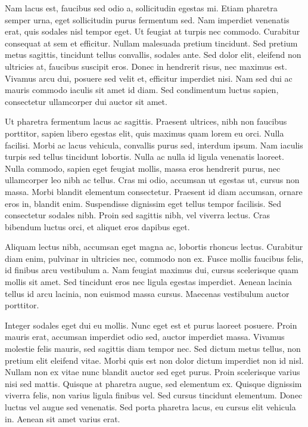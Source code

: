 \documentclass[12pt]{article}
\begin{document}
Nam lacus est, faucibus sed odio a, sollicitudin egestas mi. Etiam pharetra semper urna, eget sollicitudin purus fermentum sed. Nam imperdiet venenatis erat, quis sodales nisl tempor eget. Ut feugiat at turpis nec commodo. Curabitur consequat at sem et efficitur. Nullam malesuada pretium tincidunt. Sed pretium metus sagittis, tincidunt tellus convallis, sodales ante. Sed dolor elit, eleifend non ultricies at, faucibus suscipit eros. Donec in hendrerit risus, nec maximus est. Vivamus arcu dui, posuere sed velit et, efficitur imperdiet nisi. Nam sed dui ac mauris commodo iaculis sit amet id diam. Sed condimentum luctus sapien, consectetur ullamcorper dui auctor sit amet.

Ut pharetra fermentum lacus ac sagittis. Praesent ultrices, nibh non faucibus porttitor, sapien libero egestas elit, quis maximus quam lorem eu orci. Nulla facilisi. Morbi ac lacus vehicula, convallis purus sed, interdum ipsum. Nam iaculis turpis sed tellus tincidunt lobortis. Nulla ac nulla id ligula venenatis laoreet. Nulla commodo, sapien eget feugiat mollis, massa eros hendrerit purus, nec ullamcorper leo nibh ac tellus. Cras mi odio, accumsan ut egestas ut, cursus non massa. Morbi blandit elementum consectetur. Praesent id diam accumsan, ornare eros in, blandit enim. Suspendisse dignissim eget tellus tempor facilisis. Sed consectetur sodales nibh. Proin sed sagittis nibh, vel viverra lectus. Cras bibendum luctus orci, et aliquet eros dapibus eget.

Aliquam lectus nibh, accumsan eget magna ac, lobortis rhoncus lectus. Curabitur diam enim, pulvinar in ultricies nec, commodo non ex. Fusce mollis faucibus felis, id finibus arcu vestibulum a. Nam feugiat maximus dui, cursus scelerisque quam mollis sit amet. Sed tincidunt eros nec ligula egestas imperdiet. Aenean lacinia tellus id arcu lacinia, non euismod massa cursus. Maecenas vestibulum auctor porttitor.

Integer sodales eget dui eu mollis. Nunc eget est et purus laoreet posuere. Proin mauris erat, accumsan imperdiet odio sed, auctor imperdiet massa. Vivamus molestie felis mauris, sed sagittis diam tempor nec. Sed dictum metus tellus, non pretium elit eleifend vitae. Morbi quis est non dolor dictum imperdiet non id nisl. Nullam non ex vitae nunc blandit auctor sed eget purus. Proin scelerisque varius nisi sed mattis. Quisque at pharetra augue, sed elementum ex. Quisque dignissim viverra felis, non varius ligula finibus vel. Sed cursus tincidunt elementum. Donec luctus vel augue sed venenatis. Sed porta pharetra lacus, eu cursus elit vehicula in. Aenean sit amet varius erat.
\end{document}
